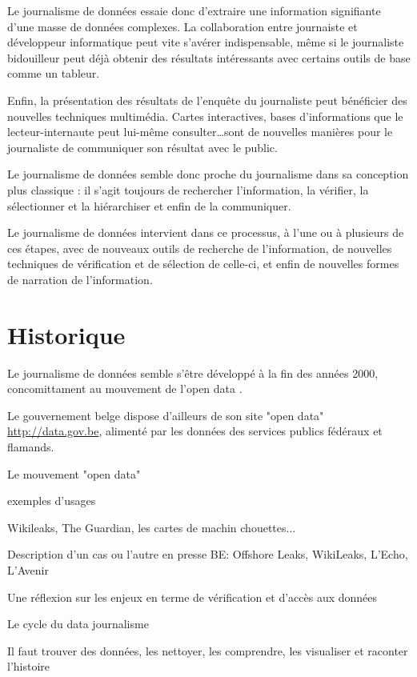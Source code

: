 Le journalisme de données essaie donc d'extraire une information signifiante 
d'une masse de données complexes. La collaboration entre journaiste et développeur 
informatique peut vite s'avérer indispensable, même si le journaliste \og bidouilleur \fg 
peut déjà obtenir des résultats intéressants avec certains outils de base comme un 
tableur.

Enfin, la présentation des résultats de l'enquête du journaliste peut bénéficier 
des nouvelles techniques multimédia. Cartes interactives, bases d'informations
que le lecteur-internaute peut lui-même consulter\dots sont de nouvelles
manières pour le journaliste de communiquer son résultat avec le public.

Le journalisme de données semble donc proche du journalisme dans sa conception 
plus classique : il s'agit toujours de rechercher l'information, la vérifier, 
la sélectionner et la hiérarchiser et enfin de la communiquer. 

Le journalisme de données intervient dans ce processus, à l'une ou à plusieurs de ces 
étapes, avec de nouveaux outils de recherche de l'information, de nouvelles 
techniques de vérification et de sélection de celle-ci, et enfin de nouvelles 
formes de narration de l'information.


\section{Historique}

Le journalisme de données semble s'être développé à la fin des années 2000, 
concomittament au mouvement de l'\og open data \fg. 

Le gouvernement belge dispose d'ailleurs de son site "open data" \url{http://data.gov.be}, alimenté par les données des services publics fédéraux et flamands.


Le mouvement "open data"

exemples d'usages

Wikileaks, The Guardian, les cartes de machin chouettes...


Description d'un cas ou l'autre en presse BE: Offshore Leaks, WikiLeaks, L'Echo, L'Avenir

Une réflexion sur les enjeux en terme de vérification et d'accès aux données


Le cycle du data journalisme

Il faut trouver des données, les nettoyer, les comprendre, les visualiser et 
raconter l'histoire
